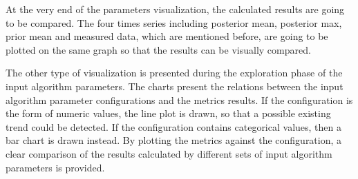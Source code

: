 At the very end of the parameters visualization, the calculated results are going to be compared. The four times series including posterior mean, posterior max, prior mean and measured data, which are mentioned before, are going to be plotted on the same graph so that the results can be visually compared.

The other type of visualization is presented during the exploration phase of the input algorithm parameters. The charts present the relations between the input algorithm parameter configurations and the metrics results. If the configuration is the form of numeric values, the line plot is drawn, so that a possible existing trend could be detected. If the configuration contains categorical values, then a bar chart is drawn instead. By plotting the metrics against the configuration, a clear comparison of the results calculated by different sets of input algorithm parameters is provided.
